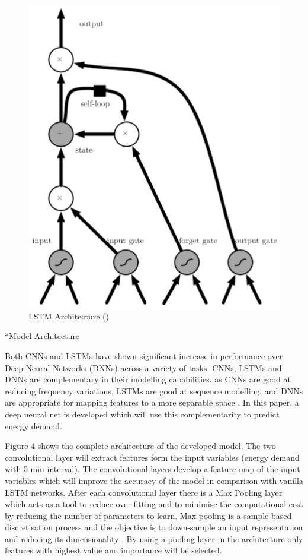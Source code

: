 \documentclass[twocolumn, a4paper,10pt]{article}
\makeatletter
\renewcommand\subsubsection{\@startsection{subsection}{1}{\z@}{0.2cm}{0.1cm}{\normalfont\normalsize\itshape}}
\makeatother
\begin{document}
\begin{figure}[ht]
    \centering
    \includegraphics[scale=0.2]{img/lstm.jpg}
    \caption{LSTM Architecture (\cite{RN1282})}
    \label{fig:lstm}
\end{figure}

\subsubsection*{Model Architecture}

Both CNNs and LSTMs have shown significant increase in performance over Deep Neural Networks (DNNs) across a variety of tasks. CNNs, LSTMs and DNNs are complementary in their modelling capabilities, as CNNs are good at reducing frequency variations, LSTMs are good at sequence modelling, and DNNs are appropriate
for mapping features to a more separable space \citep{RN1274}. In this paper, a deep neural net is developed which will use this complementarity to predict energy demand.

Figure 4 shows the complete architecture of the developed model. The two convolutional layer will extract features form the input variables (energy demand with 5 min interval). The convolutional layers develop a feature map of the input variables which will improve the accuracy of the model in comparison with vanilla LSTM networks. After each convolutional layer there is a Max Pooling layer which acts as a tool to reduce over-fitting and to minimise the computational cost by reducing the number of parameters to learn. Max pooling is a sample-based discretisation process and the objective is to down-sample an input representation and reducing its dimensionality \citep{RN1291}. By using a pooling layer in the architecture only features with highest value and importance will be selected. 
\end{document}
